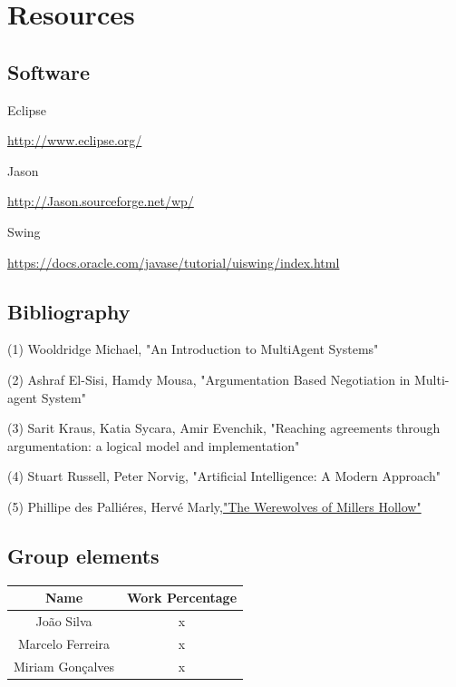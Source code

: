 \documentclass{article}
\begin{document}
\section{Resources}

\subsection{Software}
Eclipse \par
\url{http://www.eclipse.org/} \par
\vspace{3mm}
Jason \par
\url{http://Jason.sourceforge.net/wp/} \par 
\vspace{3mm}
Swing \par
\url{https://docs.oracle.com/javase/tutorial/uiswing/index.html} \par
\subsection{Bibliography}
\noindent
(1) Wooldridge Michael, "An Introduction to MultiAgent Systems"

\noindent
(2) Ashraf El-Sisi, Hamdy Mousa, "Argumentation Based Negotiation in Multi-agent System"

\noindent
(3) Sarit Kraus, Katia Sycara, Amir Evenchik, "Reaching agreements through argumentation: a logical model and implementation"

\noindent
(4) Stuart Russell, Peter Norvig, "Artificial Intelligence: A Modern Approach"

\noindent
(5) Phillipe des Palliéres, Hervé Marly,\href{https://images-cdn.asmodee.us/filer_public/16/d8/16d81cd1-7f49-4f2e-a95d-fc408bcef79a/kg01_rules.pdf}{"The Werewolves of Millers Hollow"}

\subsection{Group elements}
\begin{center}
\begin{tabular}{ |c|c| }
\hline
 \textbf{Name} & \textbf{Work Percentage} \\  
 \hline
 João Silva & x \\ 
 \hline
 Marcelo Ferreira & x \\ 
 \hline
 Miriam Gonçalves & x \\ 
 \hline
\end{tabular}
\end{center}
\end{document}
